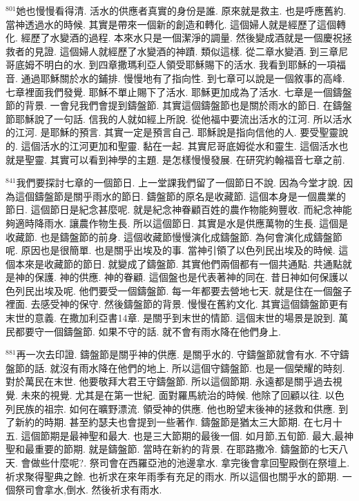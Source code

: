 \documentclass{book}
\begin{document}
$^{801}$她也慢慢看得清.
活水的供應者真實的身份是誰.
原來就是救主.
也是呼應舊約.
當神透過水的時候.
其實是帶來一個新的創造和轉化.
這個婦人就是經歷了這個轉化.
經歷了水變酒的過程.
本來水只是一個潔淨的調量.
然後變成酒就是一個慶祝拯救者的見證.
這個婦人就經歷了水變酒的神蹟.
類似這樣.
從二章水變酒.
到三章尼哥底姆不明白的水.
到四章撒瑪利亞人領受耶穌賜下的活水.
我看到耶穌的一項福音.
通過耶穌關於水的鋪排.
慢慢地有了指向性.
到七章可以說是一個敘事的高峰.
七章裡面我們發覺.
耶穌不單止賜下了活水.
耶穌更加成為了活水.
七章是一個鑄盤節的背景.
一會兒我們會提到鑄盤節.
其實這個鑄盤節也是關於雨水的節日.
在鑄盤節耶穌說了一句話.
信我的人就如經上所說.
從他福中要流出活水的江河.
所以活水的江河.
是耶穌的預言.
其實一定是預言自己.
耶穌說是指向信他的人.
要受聖靈說的.
這個活水的江河更加和聖靈.
黏在一起.
其實尼哥底姆從水和靈生.
這個活水也就是聖靈.
其實可以看到神學的主題.
是怎樣慢慢發展.
在研究約翰福音七章之前.

$^{841}$我們要探討七章的一個節日.
上一堂課我們留了一個節日不說.
因為今堂才說.
因為這個鑄盤節是關乎雨水的節日.
鑄盤節的原名是收藏節.
這個本身是一個農業的節日.
這個節日是紀念甚麼呢.
就是紀念神眷顧百姓的農作物能夠豐收.
而紀念神能夠適時降雨水.
讓農作物生長.
所以這個節日.
其實是水是供應萬物的生長.
這個是收藏節.
也是鑄盤節的前身.
這個收藏節慢慢演化成鑄盤節.
為何會演化成鑄盤節呢.
原因也是很簡單.
也是關乎出埃及的事.
當神引領了以色列民出埃及的時候.
這個本來是收藏節的節日.
就變成了鑄盤節.
其實他們兩個都有一個共通點.
共通點就是神的保護.
神的供應.
神的眷顧.
這個盤也是代表著神的同在.
昔日神如何保護以色列民出埃及呢.
他們要受一個鑄盤節.
每一年都要去營地七天.
就是住在一個盤子裡面.
去感受神的保守.
然後鑄盤節的背景.
慢慢在舊約文化.
其實這個鑄盤節更有末世的意義.
在撒加利亞書14章.
是關乎到末世的情節.
這個末世的場景是說到.
萬民都要守一個鑄盤節.
如果不守的話.
就不會有雨水降在他們身上.

$^{881}$再一次去印證.
鑄盤節是關乎神的供應.
是關乎水的.
守鑄盤節就會有水.
不守鑄盤節的話.
就沒有雨水降在他們的地上.
所以這個守鑄盤節.
也是一個榮耀的時刻.
對於萬民在末世.
他要敬拜大君王守鑄盤節.
所以這個節期.
永遠都是關乎過去視覺.
未來的視覺.
尤其是在第一世紀.
面對羅馬統治的時候.
他除了回顧以往.
以色列民族的祖宗.
如何在曠野漂流.
領受神的供應.
他也盼望末後神的拯救和供應.
到了新約的時期.
甚至約瑟夫也會提到一些著作.
鑄盤節是猶太三大節期.
在七月十五.
這個節期是最神聖和最大.
也是三大節期的最後一個.
如月節,五旬節.
最大,最神聖和最重要的節期.
就是鑄盤節.
當時在新約的背景.
在耶路撒冷.
鑄盤節的七天八天.
會做些什麼呢?.
祭司會在西羅亞池的池邊拿水.
拿完後會拿回聖殿倒在祭壇上.
祈求聚得聖典之餘.
也祈求在來年雨季有充足的雨水.
所以這個也關乎水的節期.
一個祭司會拿水,倒水.
然後祈求有雨水.
\end{document}
